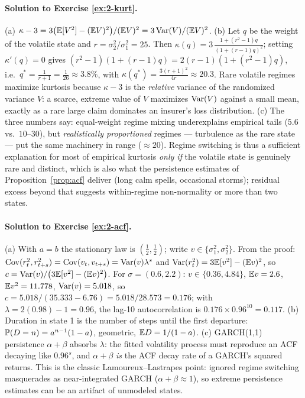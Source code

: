 \paragraph{Solution to Exercise \ref{ex:2-kurt}.}
(a) $\kappa - 3 = 3\bigl(\mathbb{E}[V^2] - (\mathbb{E} V)^2\bigr)/(\mathbb{E} V)^2 =
3\operatorname{Var}(V)/(\mathbb{E} V)^2$. (b) Let $q$ be the weight of the volatile state and
$r = \sigma_2^2/\sigma_1^2 = 25$. Then
$\kappa(q) = 3\,\frac{1 + (r^2-1)q}{(1 + (r-1)q)^2}$; setting
$\kappa'(q) = 0$ gives $(r^2-1)(1 + (r-1)q) = 2(r-1)(1 + (r^2-1)q)$, i.e.\
$q^\ast = \frac{1}{r+1} = \frac{1}{26} \approx 3.8\%$, with
$\kappa(q^\ast) = \frac{3(r+1)^2}{4r} \approx 20.3$. Rare volatile regimes
maximize kurtosis because $\kappa - 3$ is the \emph{relative} variance of
the randomized variance $V$: a scarce, extreme value of $V$ maximizes
$\operatorname{Var}(V)$ against a small mean, exactly as a rare large claim dominates an
insurer's loss distribution. (c) The three numbers say: equal-weight
regime mixing underexplains empirical tails ($5.6$ vs.\ $10$--$30$), but
\emph{realistically proportioned} regimes --- turbulence as the rare state
--- put the same machinery in range ($\approx 20$). Regime switching is
thus a sufficient explanation for most of empirical kurtosis \emph{only if}
the volatile state is genuinely rare and distinct, which is also what the
persistence estimates of Proposition~\ref{prop:acf} deliver
(long calm spells, occasional storms); residual excess beyond that
suggests within-regime non-normality or more than two states.

\paragraph{Solution to Exercise \ref{ex:2-acf}.}
(a) With $a = b$ the stationary law is $(\tfrac12, \tfrac12)$; write
$v \in \{\sigma_1^2, \sigma_2^2\}$. From the proof:
$\operatorname{Cov}(r_t^2, r_{t+s}^2) = \operatorname{Cov}(v_t, v_{t+s}) = \operatorname{Var}(v)\lambda^s$ and
$\operatorname{Var}(r_t^2) = 3\mathbb{E}[v^2] - (\mathbb{E} v)^2$, so
$c = \operatorname{Var}(v)/\bigl(3\mathbb{E}[v^2] - (\mathbb{E} v)^2\bigr)$. For
$\sigma = (0.6, 2.2)$: $v \in \{0.36, 4.84\}$, $\mathbb{E} v = 2.6$,
$\mathbb{E} v^2 = 11.778$, $\operatorname{Var}(v) = 5.018$, so
$c = 5.018/(35.333 - 6.76) = 5.018/28.573 = 0.176$; with
$\lambda = 2(0.98) - 1 = 0.96$, the lag-10 autocorrelation is
$0.176 \times 0.96^{10} = 0.117$. (b) Duration in state 1 is the number of
steps until the first departure: $\mathbb{P}(D = n) = a^{n-1}(1-a)$, geometric,
$\mathbb{E} D = 1/(1-a)$. (c) GARCH(1,1) persistence $\alpha + \beta$ absorbs
$\lambda$: the fitted volatility process must reproduce an ACF decaying
like $0.96^s$, and $\alpha+\beta$ \emph{is} the ACF decay rate of a
GARCH's squared returns. This is the classic Lamoureux--Lastrapes point:
ignored regime switching masquerades as near-integrated GARCH
($\alpha + \beta \approx 1$), so extreme persistence estimates can be an
artifact of unmodeled states.


